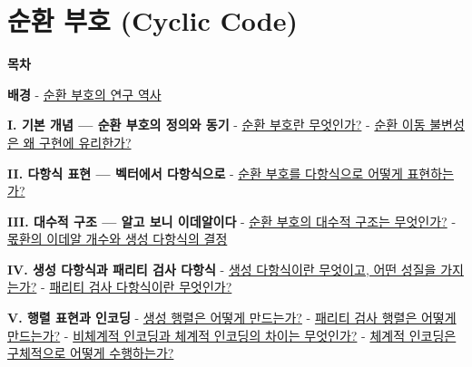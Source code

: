 \documentclass[
  oneside]{article}
\author{}
\date{}
\begin{document}
\section{순환 부호 (Cyclic
Code)}\label{uxc21cuxd658-uxbd80uxd638-cyclic-code}

\textbf{목차}

\textbf{배경} -
\hyperref[uxc21cuxd658-uxbd80uxd638uxc758-uxc5f0uxad6c-uxc5eduxc0ac]{순환
부호의 연구 역사}

\textbf{I. 기본 개념 --- 순환 부호의 정의와 동기} -
\hyperref[uxc21cuxd658-uxbd80uxd638uxb780-uxbb34uxc5c7uxc778uxac00]{순환
부호란 무엇인가?} -
\hyperref[uxc21cuxd658-uxc774uxb3d9-uxbd88uxbcc0uxc131uxc740-uxc65c-uxad6cuxd604uxc5d0-uxc720uxb9acuxd55cuxac00]{순환
이동 불변성은 왜 구현에 유리한가?}

\textbf{II. 다항식 표현 --- 벡터에서 다항식으로} -
\hyperref[uxc21cuxd658-uxbd80uxd638uxb97c-uxb2e4uxd56duxc2dduxc73cuxb85c-uxc5b4uxb5bbuxac8c-uxd45cuxd604uxd558uxb294uxac00]{순환
부호를 다항식으로 어떻게 표현하는가?}

\textbf{III. 대수적 구조 --- 알고 보니 이데알이다} -
\hyperref[uxc21cuxd658-uxbd80uxd638uxc758-uxb300uxc218uxc801-uxad6cuxc870uxb294-uxbb34uxc5c7uxc778uxac00]{순환
부호의 대수적 구조는 무엇인가?} -
\hyperref[uxbaabuxd658uxc758-uxc774uxb370uxc54c-uxac1cuxc218uxc640-uxc0dduxc131-uxb2e4uxd56duxc2dduxc758-uxacb0uxc815]{몫환의
이데알 개수와 생성 다항식의 결정}

\textbf{IV. 생성 다항식과 패리티 검사 다항식} -
\hyperref[uxc0dduxc131-uxb2e4uxd56duxc2dduxc774uxb780-uxbb34uxc5c7uxc774uxace0-uxc5b4uxb5a4-uxc131uxc9c8uxc744-uxac00uxc9c0uxb294uxac00]{생성
다항식이란 무엇이고, 어떤 성질을 가지는가?} -
\hyperref[uxd328uxb9acuxd2f0-uxac80uxc0ac-uxb2e4uxd56duxc2dduxc774uxb780-uxbb34uxc5c7uxc778uxac00]{패리티
검사 다항식이란 무엇인가?}

\textbf{V. 행렬 표현과 인코딩} -
\hyperref[uxc0dduxc131-uxd589uxb82cuxc740-uxc5b4uxb5bbuxac8c-uxb9ccuxb4dcuxb294uxac00]{생성
행렬은 어떻게 만드는가?} -
\hyperref[uxd328uxb9acuxd2f0-uxac80uxc0ac-uxd589uxb82cuxc740-uxc5b4uxb5bbuxac8c-uxb9ccuxb4dcuxb294uxac00]{패리티
검사 행렬은 어떻게 만드는가?} -
\hyperref[uxbe44uxccb4uxacc4uxc801-uxc778uxcf54uxb529uxacfc-uxccb4uxacc4uxc801-uxc778uxcf54uxb529uxc758-uxcc28uxc774uxb294-uxbb34uxc5c7uxc778uxac00]{비체계적
인코딩과 체계적 인코딩의 차이는 무엇인가?} -
\hyperref[uxccb4uxacc4uxc801-uxc778uxcf54uxb529uxc740-uxad6cuxccb4uxc801uxc73cuxb85c-uxc5b4uxb5bbuxac8c-uxc218uxd589uxd558uxb294uxac00]{체계적
인코딩은 구체적으로 어떻게 수행하는가?}
\end{document}
